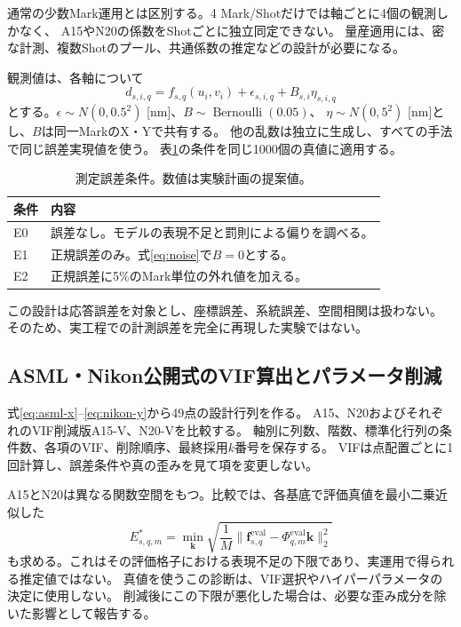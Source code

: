 \documentclass[11pt,a4paper]{ltjsarticle}
\begin{document}
通常の少数Mark運用とは区別する。4 Mark/Shotだけでは軸ごとに4個の観測しかなく、
A15やN20の係数をShotごとに独立同定できない。
量産適用には、密な計測、複数Shotのプール、共通係数の推定などの設計が必要になる。

観測値は、各軸について
\begin{equation}
 d_{s,i,q}=f_{s,q}(u_i,v_i)+\epsilon_{s,i,q}+B_{s,i}\eta_{s,i,q}
 \label{eq:noise}
\end{equation}
とする。$\epsilon\sim N(0,0.5^2)$ [nm]、$B\sim\operatorname{Bernoulli}(0.05)$、
$\eta\sim N(0,5^2)$ [nm]とし、$B$は同一MarkのX・Yで共有する。
他の乱数は独立に生成し、すべての手法で同じ誤差実現値を使う。
表\ref{tab:noise}の条件を同じ1000個の真値に適用する。

\begin{table}[htbp]
\centering
\caption{測定誤差条件。数値は実験計画の提案値。}
\label{tab:noise}
\begin{tabularx}{\linewidth}{lX}
\toprule
条件 & 内容\\
\midrule
E0 & 誤差なし。モデルの表現不足と罰則による偏りを調べる。\\
E1 & 正規誤差のみ。式\eqref{eq:noise}で$B=0$とする。\\
E2 & 正規誤差に5\%のMark単位の外れ値を加える。\\
\bottomrule
\end{tabularx}
\end{table}
この設計は応答誤差を対象とし、座標誤差、系統誤差、空間相関は扱わない。
そのため、実工程での計測誤差を完全に再現した実験ではない。

\subsection{ASML・Nikon公開式のVIF算出とパラメータ削減}
式\eqref{eq:asml-x}--\eqref{eq:nikon-y}から49点の設計行列を作る。
A15、N20およびそれぞれのVIF削減版A15-V、N20-Vを比較する。
軸別に列数、階数、標準化行列の条件数、各項のVIF、削除順序、最終採用$k$番号を保存する。
VIFは点配置ごとに1回計算し、誤差条件や真の歪みを見て項を変更しない。

A15とN20は異なる関数空間をもつ。比較では、各基底で評価真値を最小二乗近似した
\begin{equation}
 E^*_{s,q,m}=\min_{\bm k}\sqrt{\frac1M
 \|\bm f_{s,q}^{\mathrm{eval}}-\Phi_{q,m}^{\mathrm{eval}}\bm k\|_2^2}
 \label{eq:oracle}
\end{equation}
も求める。これはその評価格子における表現不足の下限であり、実運用で得られる推定値ではない。
真値を使うこの診断は、VIF選択やハイパーパラメータの決定に使用しない。
削減後にこの下限が悪化した場合は、必要な歪み成分を除いた影響として報告する。
\end{document}
